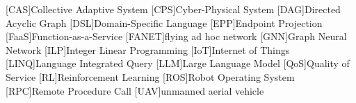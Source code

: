 
[CAS]{Collective Adaptive System}
[CPS]{Cyber-Physical System}
[DAG]{Directed Acyclic Graph}
[DSL]{Domain-Specific Language}
[EPP]{Endpoint Projection}
[FaaS]{Function-as-a-Service}
[FANET]{flying ad hoc network}
[GNN]{Graph Neural Network}
[ILP]{Integer Linear Programming}
[IoT]{Internet of Things}
[LINQ]{Language Integrated Query}
[LLM]{Large Language Model}
[QoS]{Quality of Service}
[RL]{Reinforcement Learning}
[ROS]{Robot Operating System}
[RPC]{Remote Procedure Call}
[UAV]{unmanned aerial vehicle}
